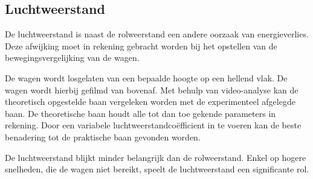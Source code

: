 \subsection{Luchtweerstand}
De luchtweerstand is naast de rolweerstand een andere oorzaak van energieverlies. Deze afwijking moet in rekening gebracht worden bij het opstellen van de bewegingsvergelijking van de wagen.

De wagen wordt losgelaten van een bepaalde hoogte op een hellend vlak. De wagen wordt hierbij gefilmd van bovenaf. Met behulp van video-analyse  kan de theoretisch opgestelde baan vergeleken worden met de experimenteel afgelegde baan. De theoretische baan houdt alle tot dan toe gekende parameters in rekening. Door een variabele luchtweerstandcoëfficient in te voeren kan de beste benadering tot de praktische baan gevonden worden.

De luchtweerstand blijkt minder belangrijk dan de rolweerstand. Enkel op hogere snelheden, die de wagen niet bereikt, speelt de luchtweerstand een significante rol.
